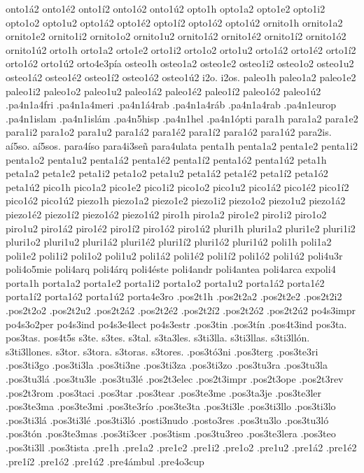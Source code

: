 {onto1á2 onto1é2 onto1í2 onto1ó2 onto1ú2
opto1h
opto1a2 opto1e2 opto1i2 opto1o2 opto1u2
opto1á2 opto1é2 opto1í2 opto1ó2 opto1ú2
ornito1h
ornito1a2 ornito1e2 ornito1i2 ornito1o2 ornito1u2
ornito1á2 ornito1é2 ornito1í2 ornito1ó2 ornito1ú2
orto1h
orto1a2 orto1e2 orto1i2 orto1o2 orto1u2
orto1á2 orto1é2 orto1í2 orto1ó2 orto1ú2
orto4e3pía
osteo1h
osteo1a2 osteo1e2 osteo1i2 osteo1o2 osteo1u2
osteo1á2 osteo1é2 osteo1í2 osteo1ó2 osteo1ú2
i2o.
i2os.
paleo1h
paleo1a2 paleo1e2 paleo1i2 paleo1o2 paleo1u2
paleo1á2 paleo1é2 paleo1í2 paleo1ó2 paleo1ú2
.pa4n1a4fri
.pa4n1a4meri
.pa4n1á4rab
.pa4n1a4ráb
.pa4n1a4rab
.pa4n1europ
.pa4n1islam
.pa4n1islám
.pa4n5hisp
.pa4n1hel
.pa4n1ópti
para1h
para1a2 para1e2 para1i2 para1o2 para1u2
para1á2 para1é2 para1í2 para1ó2 para1ú2
para2is.
aí5so.
aí5sos.
para4íso
para4i3señ
para4ulata
penta1h
penta1a2 penta1e2 penta1i2 penta1o2 penta1u2
penta1á2 penta1é2 penta1í2 penta1ó2 penta1ú2
peta1h
peta1a2 peta1e2 peta1i2 peta1o2 peta1u2
peta1á2 peta1é2 peta1í2 peta1ó2 peta1ú2
pico1h
pico1a2 pico1e2 pico1i2 pico1o2 pico1u2
pico1á2 pico1é2 pico1í2 pico1ó2 pico1ú2
piezo1h
piezo1a2 piezo1e2 piezo1i2 piezo1o2 piezo1u2
piezo1á2 piezo1é2 piezo1í2 piezo1ó2 piezo1ú2
piro1h
piro1a2 piro1e2 piro1i2 piro1o2 piro1u2
piro1á2 piro1é2 piro1í2 piro1ó2 piro1ú2
pluri1h
pluri1a2 pluri1e2 pluri1i2 pluri1o2 pluri1u2
pluri1á2 pluri1é2 pluri1í2 pluri1ó2 pluri1ú2
poli1h
poli1a2 poli1e2 poli1i2 poli1o2 poli1u2
poli1á2 poli1é2 poli1í2 poli1ó2 poli1ú2
poli4u3r
poli4o5mie
poli4arq
poli4árq
poli4éste
poli4andr
poli4antea
poli4arca
expoli4
porta1h
porta1a2 porta1e2 porta1i2 porta1o2 porta1u2
porta1á2 porta1é2 porta1í2 porta1ó2 porta1ú2
porta4e3ro
.pos2t1h
.pos2t2a2 .pos2t2e2 .pos2t2i2 .pos2t2o2 .pos2t2u2
.pos2t2á2 .pos2t2é2 .pos2t2í2 .pos2t2ó2 .pos2t2ú2
po4s3impr
po4s3o2per
po4s3ind
po4s3e4lect
po4s3estr
.pos3tin
.pos3tín
.pos4t3ind
pos3ta.
pos3tas.
pos4t5s
s3te.
s3tes.
s3tal.
s3ta3les.
s3ti3lla.
s3ti3llas.
s3ti3llón.
s3ti3llones.
s3tor.
s3tora.
s3toras.
s3tores.
.pos3tó3ni
.pos3terg
.pos3te3ri
.pos3ti3go
.pos3ti3la
.pos3ti3ne
.pos3ti3za
.pos3ti3zo
.pos3tu3ra
.pos3tu3la
.pos3tu3lá
.pos3tu3le
.pos3tu3lé
.pos2t3elec
.pos2t3impr
.pos2t3ope
.pos2t3rev
.pos2t3rom
.pos3taci
.pos3tar
.pos3tear
.pos3te3me
.pos3ta3je
.pos3te3ler
.pos3te3ma
.pos3te3mi
.pos3te3río
.pos3te3ta
.pos3ti3le
.pos3ti3llo
.pos3ti3lo
.pos3ti3lá
.pos3ti3lé
.pos3ti3ló
.posti3nudo
.posto3res
.pos3tu3lo
.pos3tu3ló
.pos3tón
.pos3te3mas
.pos3ti3cer
.pos3tism
.pos3tu3reo
.pos3te3lera
.pos3teo
.pos3ti3ll
.pos3tista
.pre1h
.pre1a2 .pre1e2 .pre1i2 .pre1o2 .pre1u2
.pre1á2 .pre1é2 .pre1í2 .pre1ó2 .pre1ú2
.pre4ámbul
.pre4o3cup
}
